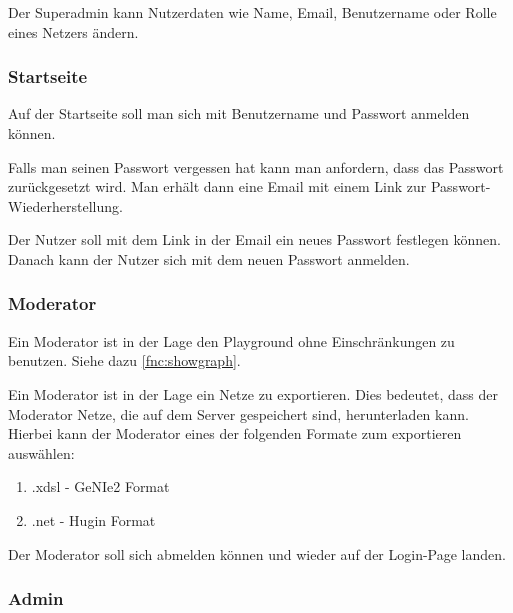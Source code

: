 \documentclass[parskip=full,11pt,twoside]{scrartcl}
\begin{document}
Der Superadmin kann Nutzerdaten wie Name, Email, Benutzername oder Rolle eines Netzers ändern. 

\subsubsection{Startseite}%

Auf der Startseite soll man sich mit Benutzername und Passwort anmelden können.


Falls man seinen Passwort vergessen hat kann man anfordern, dass das Passwort zurückgesetzt wird. Man erhält dann eine Email mit einem Link zur Passwort-Wiederherstellung.  

Der Nutzer soll mit dem Link in der Email ein neues Passwort festlegen können. Danach kann der Nutzer sich mit dem neuen Passwort anmelden.

\subsubsection{Moderator}


Ein Moderator ist in der Lage den Playground ohne Einschränkungen zu benutzen. Siehe dazu \ref{fnc:showgraph}.

Ein Moderator ist in der Lage ein Netze zu exportieren. Dies bedeutet, dass der Moderator Netze, die auf dem Server gespeichert sind, herunterladen kann. Hierbei kann der Moderator eines der folgenden Formate zum exportieren auswählen:
\begin{enumerate}
    \item .xdsl - GeNIe2 Format
    \item .net - Hugin Format %
\end{enumerate}

Der Moderator soll sich abmelden können und wieder auf der Login-Page landen. 



\subsubsection{Admin}
\end{document}
